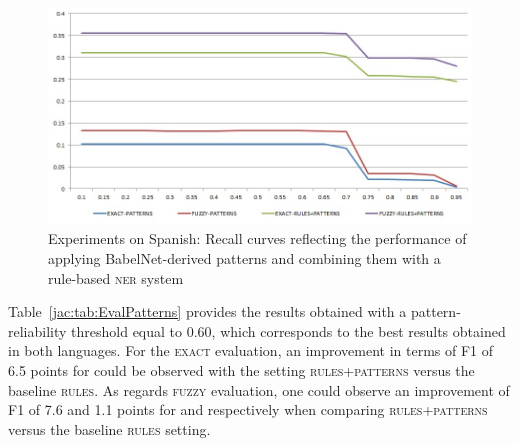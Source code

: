 \documentclass[output=paper]{langsci/langscibook}
\begin{document}
\begin{figure}
\centering
\includegraphics[width=.95\textwidth]{figures/eval_patterns_Spanish_recall.jpg}
\caption{Experiments on Spanish: Recall curves reflecting the performance of applying BabelNet-derived patterns and combining them with a rule-based \textsc{ner} system}
\label{jac:fig:eval_patterns_spanish_recall}
\end{figure}
        
Table~\ref{jac:tab:EvalPatterns} provides the results obtained with a pattern-reliability threshold equal to 0.60, which corresponds to the best results obtained in both languages. For the \textsc{exact} evaluation, an improvement in terms of F1 of 6.5 points for  could be observed with the setting \textsc{rules+patterns} versus the baseline \textsc{rules}. As regards \textsc{fuzzy} evaluation, one could observe an improvement of F1 of 7.6 and 1.1 points for  and  respectively when comparing \textsc{rules+patterns} versus the baseline \textsc{rules} setting.
\end{document}
